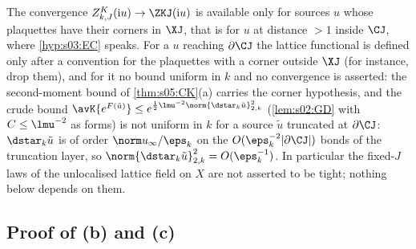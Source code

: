 \begin{remark}\label{rem:s09:S2K}
The convergence $Z^K_{k,J}(\mathrm iu)\to\ZKJ(\mathrm iu)$ is available only for sources $u$ whose plaquettes have their corners in $\XJ$, that is for $u$ at distance $>1$ inside $\CJ$, where \cref{hyp:s03:EC} speaks. For a $u$ reaching $\partial\CJ$ the lattice functional is defined only after a convention for the plaquettes with a corner outside $\XJ$ (for instance, drop them), and for it no bound uniform in $k$ and no convergence is asserted: the second-moment bound of \cref{thm:s05:CK}(a) carries the corner hypothesis, and the crude bound $\avK{e^{F(\tilde u)}}\le e^{\frac12\lmu^{-2}\norm{\dstar_k\tilde u}^2_{2,k}}$ (\cref{lem:s02:GD} with $C\le\lmu^{-2}$ as forms) is not uniform in $k$ for a source $\tilde u$ truncated at $\partial\CJ$: $\dstar_k\tilde u$ is of order $\norm u_\infty/\eps_k$ on the $O(\eps_k^{-2}|\partial\CJ|)$ bonds of the truncation layer, so $\norm{\dstar_k\tilde u}^2_{2,k}=O(\eps_k^{-1})$. In particular the fixed-$J$ laws of the unlocalised lattice field on $X$ are not asserted to be tight; nothing below depends on them.
\end{remark}

\subsection{Proof of (b) and (c)}

